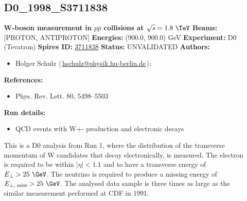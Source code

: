 \subsection[D0\_1998\_S3711838]{D0\_1998\_S3711838\,\cite{Abbott:1998jy}}
\textbf{W-boson \pT measurement in $p\bar{p}$ collisions at $\sqrt{s}=1.8~\TeV$}\newline
\textbf{Beams:} [PROTON, ANTIPROTON] \newline
\textbf{Energies:} (900.0, 900.0) GeV \newline
\textbf{Experiment:} D0 (Tevatron) \newline
\textbf{Spires ID:} \href{http://www.slac.stanford.edu/spires/find/hep/www?rawcmd=key+3711838}{3711838}\newline
\textbf{Status:} UNVALIDATED\newline
\textbf{Authors:}
\begin{itemize}
  \item Holger Schulz $\langle\,$\href{mailto:hschulz@physik.hu-berlin.de}{hschulz@physik.hu-berlin.de}$\,\rangle$;
\end{itemize}
\textbf{References:}
\begin{itemize}
  \item Phys. Rev. Lett. 80, 5498–5503
\end{itemize}
\textbf{Run details:}
\begin{itemize}

  \item QCD events with W+- production and electronic decays\end{itemize}

\noindent This is a D0 analysis from Run 1, where the distribution of the transverse momentum of W candidates that decay  electronically, is measured. The electron is required to be within $\left|\eta\right| < 1.1$ and to have a transverse energy of $E_\perp > 25~\GeV$.  The neutrino is required to produce a missing energy of $E_{\perp, \text{ miss}}>25~\GeV$. The analysed data sample is three times as large as the similar measurement performed at CDF in 1991.

\clearpage


\clearpage

